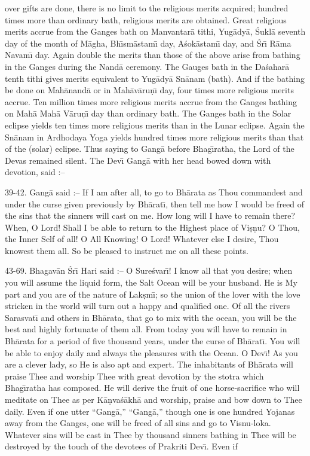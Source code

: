 over gifts are done, there is no limit to the religious merits acquired; hundred times more than ordinary bath, religious merits are obtained. Great religious merits accrue from the Ganges bath on Manvantar\=a tithi, Yug\=ady\=a, \'Sukl\=a seventh day of the month of M\=agha, Bh\={\i}sm\=astam\={\i} day, A\'sok\=astam\={\i} day, and \'Sr\={\i} R\=ama Navam\={\i} day. Again double the merits than those of the above arise from bathing in the Ganges during the Nand\=a ceremony. The Gauges bath in the Da\'sahar\=a tenth tithi gives merits equivalent to Yug\=ady\=a Sn\=anam (bath). And if the bathing be done on Mah\=anand\=a or in Mah\=av\=aru\d{n}\={\i} day, four times more religious merits accrue. Ten million times more religious merits accrue from the Ganges bathing on Mah\=a Mah\=a V\=aru\d{n}\={\i} day than ordinary bath. The Ganges bath in the Solar eclipse yields ten times more religious merits than in the Lunar eclipse. Again the Sn\=anam in Ardhodaya Yoga yields hundred times more religious merits than that of the (solar) eclipse. Thus saying to Gang\=a before Bhag\={\i}ratha, the Lord of the Devas remained silent. The Dev\={\i} Gang\=a with her head bowed down with devotion, said :--

39-42. Gang\=a said :-- If I am after all, to go to Bh\=arata as Thou commandest and under the curse given previously by Bh\=arat\={\i}, then tell me how I would be freed of the sins that the sinners will cast on me. How long will I have to remain there? When, O Lord! Shall I be able to return to the Highest place of Vi\d{s}\d{n}u? O Thou, the Inner Self of all! O All Knowing! O Lord! Whatever else I desire, Thou knowest them all. So be pleased to instruct me on all these points.

43-69. Bhagav\=an \'Sr\={\i} Hari said :-- O Sure\'svar\={\i}! I know all that you desire; when you will assume the liquid form, the Salt Ocean will be your husband. He is My part and you are of the nature of Lak\d{s}m\={\i}; so the union of the lover with the love stricken in the world will turn out a happy and qualified one. Of all the rivers Sarasvat\={\i} and others in Bh\=arata, that go to mix with the ocean, you will be the best and highly fortunate of them all. From today you will have to remain in Bh\=arata for a period of five thousand years, under the curse of Bh\=arat\={\i}. You will be able to enjoy daily and always the pleasures with the Ocean. O Dev\={\i}! As you are a clever lady, so He is also apt and expert. The inhabitants of Bh\=arata will praise Thee and worship Thee with great devotion by the stotra which Bhag\={\i}ratha has composed. He will derive the fruit of one horse-sacrifice who will meditate on Thee as per K\=a\d{n}va\'s\=akh\=a and worship, praise and bow down to Thee daily. Even if one utter ``Gang\=a,'' ``Gang\=a,'' though one is one hundred Yojanas away from the Ganges, one will be freed of all sins and go to Visnu-loka. Whatever sins will be cast in Thee by thousand sinners bathing in Thee will be destroyed by the touch of the devotees of Prakriti Dev\={\i}. Even if

